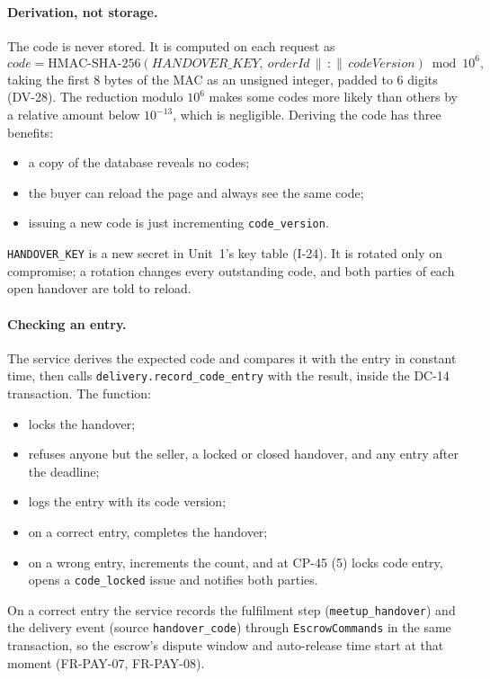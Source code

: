 \documentclass[11pt,a4paper]{article}
\begin{document}
\paragraph{Derivation, not storage.} The code is never stored. It is computed on each request as
\[ \mathit{code} = \mathrm{HMAC\text{-}SHA\text{-}256}(\mathit{HANDOVER\_KEY},\ \mathit{orderId} \,\|\, \texttt{:} \,\|\, \mathit{codeVersion}) \bmod 10^6, \]
taking the first 8 bytes of the MAC as an unsigned integer, padded to 6 digits (DV-28). The reduction modulo $10^6$ makes some codes more likely than others by a relative amount below $10^{-13}$, which is negligible. Deriving the code has three benefits:
\begin{itemize}[nosep]
  \item a copy of the database reveals no codes;
  \item the buyer can reload the page and always see the same code;
  \item issuing a new code is just incrementing \texttt{code\_version}.
\end{itemize}
\texttt{HANDOVER\_KEY} is a new secret in Unit~1's key table (I-24). It is rotated only on compromise; a rotation changes every outstanding code, and both parties of each open handover are told to reload.

\paragraph{Checking an entry.} The service derives the expected code and compares it with the entry in constant time, then calls \texttt{delivery.record\_code\_entry} with the result, inside the DC-14 transaction. The function:
\begin{itemize}[nosep]
  \item locks the handover;
  \item refuses anyone but the seller, a locked or closed handover, and any entry after the deadline;
  \item logs the entry with its code version;
  \item on a correct entry, completes the handover;
  \item on a wrong entry, increments the count, and at CP-45 (5) locks code entry, opens a \texttt{code\_locked} issue and notifies both parties.
\end{itemize}
On a correct entry the service records the fulfilment step (\texttt{meetup\_handover}) and the delivery event (source \texttt{handover\_code}) through \texttt{EscrowCommands} in the same transaction, so the escrow's dispute window and auto-release time start at that moment (FR-PAY-07, FR-PAY-08).
\end{document}
